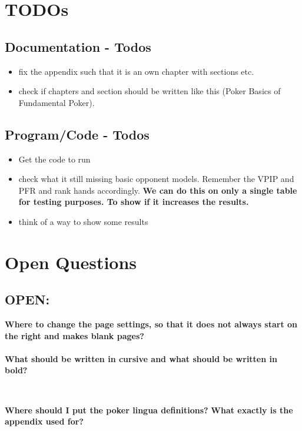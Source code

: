 



\newpage

\chapter{TODOs}
\section{Documentation - Todos}
\begin{itemize}
\item fix the appendix such that it is an own chapter with sections etc.
\item check if chapters and section should be written like this (Poker Basics of Fundamental Poker).
\end{itemize}
\section{Program/Code - Todos}
\begin{itemize}
\item Get the code to run
\item check what it still missing
\subitem basic opponent models. Remember the VPIP and PFR and rank hands accordingly. \textbf{We can do this on only a single table for testing purposes. To show if it increases the results.}
\item think of a way to show some results
\end{itemize}
\chapter{Open Questions}
\section{OPEN:}
\textbf{Where to change the page settings, so that it does not always start on the right and makes blank pages?}\\\\
\textbf{What should be written in cursive and what should be written in bold?}\\
\begin{addmargin}[1em]{2em}%
\\
\end{addmargin}
\textbf{Where should I put the poker lingua definitions?}
\textbf{What exactly is the appendix used for?}
